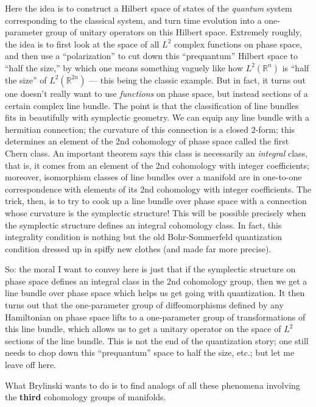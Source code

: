 \documentclass{article}
\begin{document}
Here the idea is to construct a Hilbert space of states of the
\emph{quantum} system corresponding to the classical system, and turn
time evolution into a one-parameter group of unitary operators on this
Hilbert space. Extremely roughly, the idea is to first look at the space
of all \(L^2\) complex functions on phase space, and then use a
``polarization'' to cut down this ``prequantum'' Hilbert space to ``half
the size,'' by which one means something vaguely like how
\(L^2(\mathbb{R}^n)\) is ``half the size'' of \(L^2(\mathbb{R}^{2n})\)
--- this being the classic example. But in fact, it turns out one
doesn't really want to use \emph{functions} on phase space, but instead
sections of a certain complex line bundle. The point is that the
classification of line bundles fits in beautifully with symplectic
geometry. We can equip any line bundle with a hermitian connection; the
curvature of this connection is a closed \(2\)-form; this determines an
element of the 2nd cohomology of phase space called the first Chern
class. An important theorem says this class is necessarily an
\emph{integral} class, that is, it comes from an element of the 2nd
cohomology with integer coefficients; moreover, isomorphism classes of
line bundles over a manifold are in one-to-one correspondence with
elements of its 2nd cohomology with integer coefficients. The trick,
then, is to try to cook up a line bundle over phase space with a
connection whose curvature is the symplectic structure! This will be
possible precisely when the symplectic structure defines an integral
cohomology class. In fact, this integrality condition is nothing but the
old Bohr-Sommerfeld quantization condition dressed up in spiffy new
clothes (and made far more precise).

So: the moral I want to convey here is just that if the symplectic
structure on phase space defines an integral class in the 2nd cohomology
group, then we get a line bundle over phase space which helps us get
going with quantization. It then turns out that the one-parameter group
of diffeomorphisms defined by any Hamiltonian on phase space lifts to a
one-parameter group of transformations of this line bundle, which allows
us to get a unitary operator on the space of \(L^2\) sections of the
line bundle. This is not the end of the quantization story; one still
needs to chop down this ``prequantum'' space to half the size, etc.; but
let me leave off here.

What Brylinski wants to do is to find analogs of all these phenomena
involving the \textbf{third} cohomology groups of manifolds.
\end{document}
